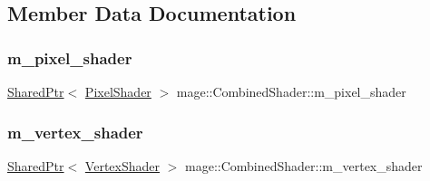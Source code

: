 \subsection{Member Data Documentation}
\hypertarget{structmage_1_1_combined_shader_a562b58278dcb98469c98250a636c640e}{}\label{structmage_1_1_combined_shader_a562b58278dcb98469c98250a636c640e} 
\subsubsection{\texorpdfstring{m\+\_\+pixel\+\_\+shader}{m\_pixel\_shader}}
{\footnotesize\ttfamily \hyperlink{namespacemage_a1e01ae66713838a7a67d30e44c67703e}{Shared\+Ptr}$<$ \hyperlink{classmage_1_1_pixel_shader}{Pixel\+Shader} $>$ mage\+::\+Combined\+Shader\+::m\+\_\+pixel\+\_\+shader\hspace{0.3cm}{\ttfamily [private]}}

\hypertarget{structmage_1_1_combined_shader_ae70a1404acc466fc7fbcb05756140f54}{}\label{structmage_1_1_combined_shader_ae70a1404acc466fc7fbcb05756140f54} 
\subsubsection{\texorpdfstring{m\+\_\+vertex\+\_\+shader}{m\_vertex\_shader}}
{\footnotesize\ttfamily \hyperlink{namespacemage_a1e01ae66713838a7a67d30e44c67703e}{Shared\+Ptr}$<$ \hyperlink{classmage_1_1_vertex_shader}{Vertex\+Shader} $>$ mage\+::\+Combined\+Shader\+::m\+\_\+vertex\+\_\+shader\hspace{0.3cm}{\ttfamily [private]}}

